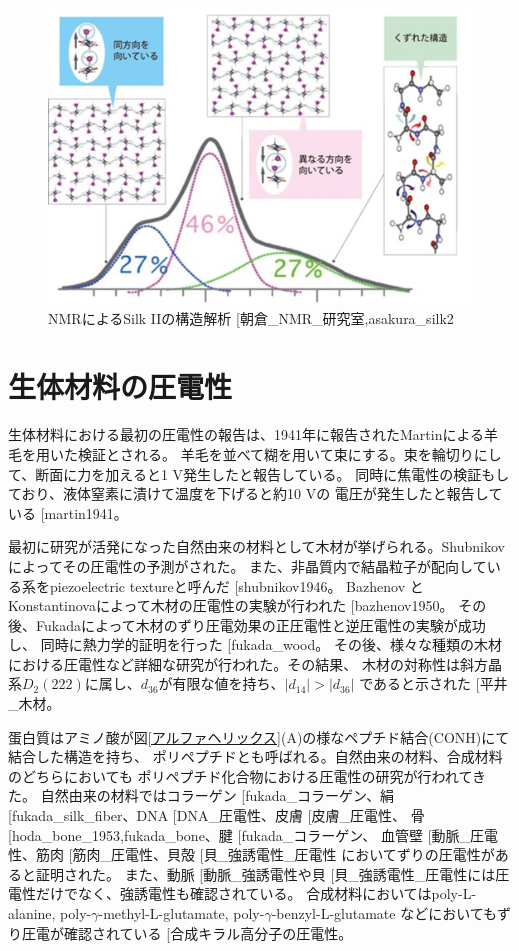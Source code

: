 \documentclass[dvipdfmx,12pt,a4paper]{jreport}
\makeatletter
\DeclareRobustCommand\cite{\unskip
    	\@ifnextchar[{\@tempswatrue\@citex}{\@tempswafalse\@citex[]}}
\makeatother
\begin{document}
		\begin{figure}[H]
			\centering
			\includegraphics[scale=0.3]{NMR_silk_II.jpg}
			\caption{NMRによるSilk IIの構造解析\cite{朝倉_NMR_研究室,asakura_silk2}}
		\end{figure}
		\newpage
		\section{生体材料の圧電性}
			生体材料における最初の圧電性の報告は、1941年に報告されたMartinによる羊毛を用いた検証とされる。
			羊毛を並べて糊を用いて束にする。束を輪切りにして、断面に力を加えると1 V発生したと報告している。
			同時に焦電性の検証もしており、液体窒素に漬けて温度を下げると約10 Vの
			電圧が発生したと報告している\cite{martin1941}。

			最初に研究が活発になった自然由来の材料として木材が挙げられる。Shubnikovによってその圧電性の予測がされた。
			また、非晶質内で結晶粒子が配向している系をpiezoelectric textureと呼んだ\cite{shubnikov1946}。
			Bazhenov と Konstantinovaによって木材の圧電性の実験が行われた\cite{bazhenov1950}。
			その後、Fukadaによって木材のずり圧電効果の正圧電性と逆圧電性の実験が成功し、
			同時に熱力学的証明を行った\cite{fukada_wood}。
			その後、様々な種類の木材における圧電性など詳細な研究が行われた。その結果、
			木材の対称性は斜方晶系$D_2(222)$に属し、$d_{36}$が有限な値を持ち、$|d_{14}|>|d_{36}|$
			であると示された\cite{平井_木材}。

			蛋白質はアミノ酸が図\ref{アルファヘリックス}(A)の様なペプチド結合(CONH)にて結合した構造を持ち、
			ポリペプチドとも呼ばれる。自然由来の材料、合成材料のどちらにおいても
			ポリペプチド化合物における圧電性の研究が行われてきた。
			自然由来の材料ではコラーゲン\cite{fukada_コラーゲン}、絹\cite{fukada_silk_fiber}、DNA\cite{DNA_圧電性}、皮膚\cite{皮膚_圧電性}、
			骨\cite{hoda_bone_1953,fukada_bone}、腱\cite{fukada_コラーゲン}、
			血管壁\cite{動脈_圧電性}、筋肉\cite{筋肉_圧電性}、貝殻\cite{貝_強誘電性_圧電性}
			においてずりの圧電性があると証明された。
			また、動脈\cite{動脈_強誘電性}や貝\cite{貝_強誘電性_圧電性}には圧電性だけでなく、強誘電性も確認されている。
			合成材料においてはpoly-L-alanine, poly-$\gamma$-methyl-L-glutamate, poly-$\gamma$-benzyl-L-glutamate
			などにおいてもずり圧電が確認されている\cite{合成キラル高分子の圧電性}。
\end{document}
